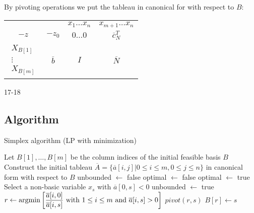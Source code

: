 By pivoting operations we put the tableau in canonical for with respect to $B$:
\begin{table}[H]
    \centering
    \begin{tabular}{cccc}
                                                                &                                           & $x_1 \dots x_n$                       & $x_{m+1}\dots x_n$                                \\ \cline{2-4}
    $-z$                                                        & \multicolumn{1}{|c|}{$-z_0$}              & \multicolumn{1}{c|}{$0 \dots 0$}      & \multicolumn{1}{c|}{$\overline{c}_N^T$}           \\ \cline{2-4}
    $\begin{matrix}X_{B[1]}\\\vdots\\X_{B[m]}\end{matrix}$      & \multicolumn{1}{|c|}{$\overline{b}$}      & \multicolumn{1}{c|}{$I$}              & \multicolumn{1}{c|}{$\overline{N}$}               \\ \cline{2-4}
    \end{tabular}
\end{table}
\begin{example}
    17-18
\end{example}

\subsection*{Algorithm}
\begin{algorithm}[H]
    \caption{Simplex algorithm (LP with minimization)}
        \begin{algorithmic}[1]
            \State Let $B[1],\dots,B[m]$ be the column indices of the initial feasible basis $B$
            \State Construct the initial tableau $\overline{A}=\{\overline{a}[i,j]|0 \leq i \leq m, 0 \leq j \leq n\}$ in canonical form with respect to $B$
            \State unbounded $\leftarrow$ false
            \State optimal $\leftarrow$ false
                    \State optimal $\leftarrow$ true
                \Else
                    \State Select a non-basic variable $x_s$ with $\overline{a}[0,s] < 0$
                        \State unbounded $\leftarrow$ true
                    \Else 
                        \State $r \leftarrow \textnormal{argmin}\left[ \dfrac{\overline{a}[i,0]}{\overline{a}[i,s]} \textnormal{ with } 1 \leq i \leq m \textnormal{ and } \overline{a}[i,s]>0\right]$
                        \State $pivot(r,s)$
                        \State $B[r] \leftarrow s$
                    \EndIf
                \EndIf
            \EndWhile
        \end{algorithmic}
\end{algorithm}

